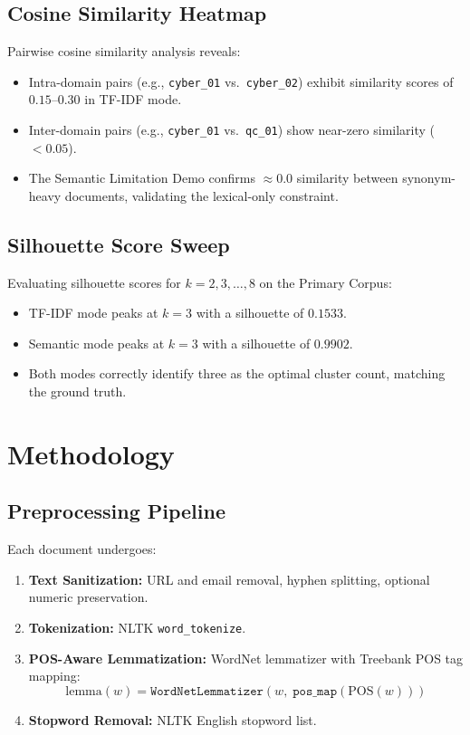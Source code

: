 \documentclass[12pt, a4paper]{article}
\begin{document}
\subsection{Cosine Similarity Heatmap}
Pairwise cosine similarity analysis reveals:
\begin{itemize}[nosep]
    \item Intra-domain pairs (e.g., \texttt{cyber\_01} vs.\ \texttt{cyber\_02}) exhibit similarity scores of $0.15$--$0.30$ in TF-IDF mode.
    \item Inter-domain pairs (e.g., \texttt{cyber\_01} vs.\ \texttt{qc\_01}) show near-zero similarity ($< 0.05$).
    \item The Semantic Limitation Demo confirms $\approx 0.0$ similarity between synonym-heavy documents, validating the lexical-only constraint.
\end{itemize}

\subsection{Silhouette Score Sweep}
Evaluating silhouette scores for $k = 2, 3, \ldots, 8$ on the Primary Corpus:
\begin{itemize}[nosep]
    \item TF-IDF mode peaks at $k=3$ with a silhouette of $0.1533$.
    \item Semantic mode peaks at $k=3$ with a silhouette of $\mathbf{0.9902}$.
    \item Both modes correctly identify three as the optimal cluster count, matching the ground truth.
\end{itemize}

\section{Methodology}

\subsection{Preprocessing Pipeline}
Each document undergoes:
\begin{enumerate}[nosep]
    \item \textbf{Text Sanitization:} URL and email removal, hyphen splitting, optional numeric preservation.
    \item \textbf{Tokenization:} NLTK \texttt{word\_tokenize}.
    \item \textbf{POS-Aware Lemmatization:} WordNet lemmatizer with Treebank POS tag mapping:
    \begin{equation}
        \text{lemma}(w) = \texttt{WordNetLemmatizer}(w, \; \texttt{pos\_map}(\text{POS}(w)))
    \end{equation}
    \item \textbf{Stopword Removal:} NLTK English stopword list.
\end{enumerate}
\end{document}
